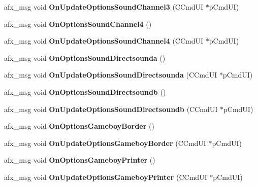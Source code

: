 \begin{DoxyCompactItemize}
afx\+\_\+msg void {\bfseries On\+Update\+Options\+Sound\+Channel3} (C\+Cmd\+UI $\ast$p\+Cmd\+UI)
\item 
\mbox{\label{class_main_wnd_a1c6886c26731e96cff8cd50c16c42101}} 
afx\+\_\+msg void {\bfseries On\+Options\+Sound\+Channel4} ()
\item 
\mbox{\label{class_main_wnd_aafd7a1e3f482022ffbb6731f02de0ee1}} 
afx\+\_\+msg void {\bfseries On\+Update\+Options\+Sound\+Channel4} (C\+Cmd\+UI $\ast$p\+Cmd\+UI)
\item 
\mbox{\label{class_main_wnd_adf862907e5764ee38c51cdd192dc5bae}} 
afx\+\_\+msg void {\bfseries On\+Options\+Sound\+Directsounda} ()
\item 
\mbox{\label{class_main_wnd_a47d8a1f6079e54d268ff2a19a34aba6e}} 
afx\+\_\+msg void {\bfseries On\+Update\+Options\+Sound\+Directsounda} (C\+Cmd\+UI $\ast$p\+Cmd\+UI)
\item 
\mbox{\label{class_main_wnd_a19e333bd762c2497d3ff416d21c3c0c0}} 
afx\+\_\+msg void {\bfseries On\+Options\+Sound\+Directsoundb} ()
\item 
\mbox{\label{class_main_wnd_aa1b7a906630cf65b6a41c416eaecf3c3}} 
afx\+\_\+msg void {\bfseries On\+Update\+Options\+Sound\+Directsoundb} (C\+Cmd\+UI $\ast$p\+Cmd\+UI)
\item 
\mbox{\label{class_main_wnd_a8fce3257c75cb141371c422adbcb5fd1}} 
afx\+\_\+msg void {\bfseries On\+Options\+Gameboy\+Border} ()
\item 
\mbox{\label{class_main_wnd_a29620d7ff13dcf0a51ba63a051e9b2d4}} 
afx\+\_\+msg void {\bfseries On\+Update\+Options\+Gameboy\+Border} (C\+Cmd\+UI $\ast$p\+Cmd\+UI)
\item 
\mbox{\label{class_main_wnd_a5909d22b4cea6315004fc60b0f997b23}} 
afx\+\_\+msg void {\bfseries On\+Options\+Gameboy\+Printer} ()
\item 
\mbox{\label{class_main_wnd_ab7257fc8414b9a73639c04106ecd1765}} 
afx\+\_\+msg void {\bfseries On\+Update\+Options\+Gameboy\+Printer} (C\+Cmd\+UI $\ast$p\+Cmd\+UI)

\end{DoxyCompactItemize}
